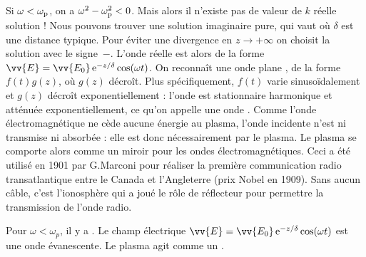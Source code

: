 \documentclass[12pt,fancy]{cours}
\begin{document}
Si $\omega<\omega_{\rm{p}}$, on a $\omega^2-\omega_{\rm{p}}^2<0$. Mais alors il n’existe pas de valeur de $k$ réelle solution ! Nous pouvons trouver une solution imaginaire pure, qui vaut
où $\delta$ est une distance typique.
Pour éviter une divergence en $z\rightarrow+\infty$ on choisit la solution avec le signe~$-$. L'onde réelle est alors de la forme $\vv{E}=\vv{E_0}\,\e^{-z/\delta}\cos(\omega t)$. On reconnaît une onde plane , de la forme $f(t)g(z)$, où $g(z)$ décroît. Plus spécifiquement, $f(t)$ varie sinusoïdalement et $g(z)$ décroît exponentiellement : l'onde est stationnaire harmonique et atténuée exponentiellement, ce qu'on appelle une onde .
  Comme l'onde électromagnétique ne cède aucune énergie au plasma, l'onde incidente n'est ni transmise ni absorbée : elle est donc nécessairement  par le plasma. Le plasma se comporte alors comme un miroir pour les ondes électromagnétiques. Ceci a été utilisé en 1901 par G.Marconi pour réaliser la première communication radio transatlantique entre le Canada et l'Angleterre (prix Nobel en 1909). Sans aucun câble, c'est l'ionosphère qui a joué le rôle de réflecteur pour permettre la transmission de l'onde radio.
  
  \begin{prop}\label{prop:}
    Pour $\omega < \omega_p$, il y a . Le champ électrique  $\vv{E}=\vv{E_0}\,\e^{-z/\delta}\cos(\omega t)$ est une onde évanescente. Le plasma agit comme un .
  \end{prop}
  
\end{document}
